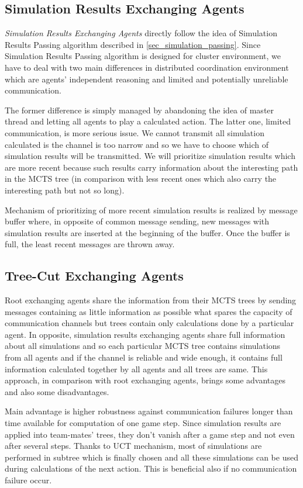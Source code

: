 \subsection{Simulation Results Exchanging Agents}

\emph{Simulation Results Exchanging Agents} directly follow the idea of Simulation Results
Passing algorithm described in \ref{sec_simulation_passing}. Since Simulation Results Passing
algorithm is designed for cluster environment, we have to deal with two main differences in
distributed coordination environment which are agents' independent reasoning and limited
and potentially unreliable communication. 

The former difference is simply managed by abandoning
the idea of master thread and letting all agents to play a calculated action. The latter one,
limited communication, is more serious issue. We cannot transmit all simulation calculated is
the channel is too narrow and so we have to choose which of simulation results will be
transmitted. We will prioritize simulation results which are more recent because such results
carry information about the interesting path in the MCTS tree (in comparison with less recent
ones which also carry the interesting path but not so long).

Mechanism of prioritizing of more recent simulation results is realized by message buffer
where, in opposite of common message sending, new messages with simulation results are inserted
at the beginning of the buffer. Once the buffer is full, the least recent messages are thrown
away.


\subsection{Tree-Cut Exchanging Agents}

Root exchanging agents share the information from their MCTS trees by sending messages
containing as little information as possible what spares the capacity of communication
channels but trees contain only calculations done by a particular agent. In opposite,
simulation results exchanging agents share full information about all simulations and so
each particular MCTS tree contains simulations from all agents and if the channel is reliable
and wide enough, it contains full information calculated together by all agents and all
trees are same. This approach, in comparison with root exchanging agents, brings some
advantages and also some disadvantages. 

Main advantage is higher robustness against
communication failures longer than time available for computation of one game step. Since
simulation results are applied into team-mates' trees, they don't vanish after a game step and
not even after several steps. Thanks to UCT mechanism, most of simulations are performed in
subtree which is finally chosen and all these simulations can be used during calculations of
the next action. This is beneficial also if no communication failure occur.

